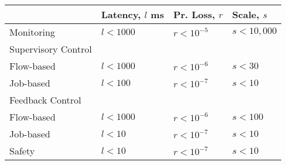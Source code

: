 \begin{tabular}{llll}
 &
  Latency, $l$ \si{ms} &
  Pr. Loss, $r$ &
  Scale, $s$
  \\
\midrule
Monitoring &
  $l<1000$ &
  $r<10^{-5}$ &
  $s<10,000$
  \\
\midrule
Supervisory Control &
   &
   &
  
  \\
   Flow-based &
  $l<1000$ &
  $r<10^{-6}$ &
  $s<30$
  \\
   Job-based &
  $l<100$ &
  $r<10^{-7}$ &
  $s<10$
  \\
\midrule
Feedback Control &
   &
   &
  
  \\
   Flow-based &
  $l<1000$ &
  $r<10^{-6}$ &
  $s<100$
  \\
   Job-based &
  $l<10$ &
  $r<10^{-7}$ &
  $s<10$
  \\
\midrule
Safety &
  $l<10$ &
  $r<10^{-7}$ &
  $s<10$
  \\
\bottomrule
\end{tabular}%
